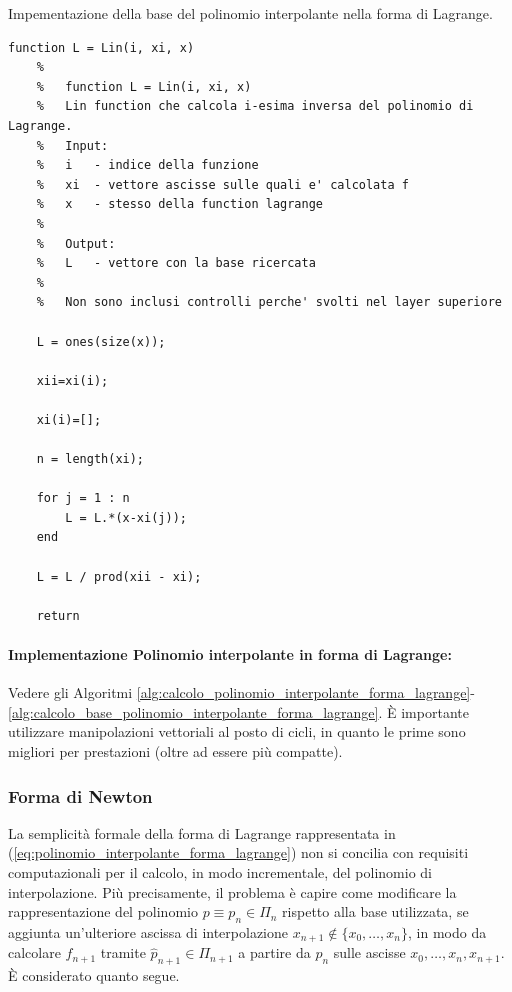 \begin{algorithm}
\caption{Impementazione della base del polinomio interpolante nella forma di Lagrange.}\label{alg:calcolo_base_polinomio_interpolante_forma_lagrange}
    \begin{lstlisting}[style=Matlab-editor]
    function L = Lin(i, xi, x)
    %
    %   function L = Lin(i, xi, x)
    %   Lin function che calcola i-esima inversa del polinomio di Lagrange.
    %   Input:
    %   i   - indice della funzione
    %   xi  - vettore ascisse sulle quali e' calcolata f
    %   x   - stesso della function lagrange
    %
    %   Output:
    %   L   - vettore con la base ricercata
    %
    %   Non sono inclusi controlli perche' svolti nel layer superiore
    
    L = ones(size(x));
    
    xii=xi(i);
    
    xi(i)=[];
    
    n = length(xi);
    
    for j = 1 : n
        L = L.*(x-xi(j));
    end
    
    L = L / prod(xii - xi);
    
    return
    \end{lstlisting}
\end{algorithm}

\paragraph{Implementazione Polinomio interpolante in forma di Lagrange:} Vedere gli Algoritmi \ref{alg:calcolo_polinomio_interpolante_forma_lagrange}-\ref{alg:calcolo_base_polinomio_interpolante_forma_lagrange}. È importante utilizzare manipolazioni vettoriali al posto di cicli, in quanto le prime sono migliori per prestazioni (oltre ad essere più compatte).

\subsubsection{Forma di Newton}

La semplicità formale della forma di Lagrange rappresentata in (\ref{eq:polinomio_interpolante_forma_lagrange}) non si concilia con requisiti computazionali per il calcolo, in modo incrementale, del polinomio di interpolazione. Più precisamente, il problema è capire come modificare la rappresentazione del polinomio $p\equiv p_n\in\Pi_n$ rispetto alla base utilizzata, se aggiunta un'ulteriore ascissa di interpolazione $x_{n+1}\notin\{x_0,\hdots,x_n\}$, in modo da calcolare $f_{n+1}$ tramite $\widehat{p}_{n+1}\in\Pi_{n+1}$ a partire da $p_n$ sulle ascisse $x_0,\hdots,x_n, x_{n+1}$. È considerato quanto segue.

